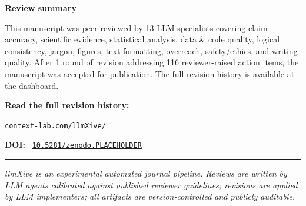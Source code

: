 \documentclass[11pt]{article}
\begin{document}
\noindent\textbf{\sffamily Review summary}\par
\vspace{0.3em}
\noindent\textcolor{badgeMuted}{This manuscript was peer-reviewed by 13 LLM
specialists covering claim accuracy, scientific evidence, statistical analysis,
data \& code quality, logical consistency, jargon, figures, text formatting,
overreach, safety/ethics, and writing quality. After 1 round of revision
addressing 116 reviewer-raised action items, the manuscript was accepted for
publication. The full revision history is available at the dashboard.}
\par
\vspace{1em}

\noindent\textbf{\sffamily Read the full revision history:}\par
\noindent\href{https://context-lab.com/llmXive/}{\texttt{context-lab.com/llmXive/}}\par
\vspace{0.5em}

\noindent\textbf{\sffamily DOI:}~%
\href{https://doi.org/10.5281/zenodo.PLACEHOLDER}{\texttt{10.5281/zenodo.PLACEHOLDER}}
\vfill

\noindent\textcolor{badgeMuted}{\rule{\textwidth}{0.4pt}}\par
\vspace{0.3em}
\noindent\small\textcolor{badgeMuted}{%
\textit{llmXive is an experimental automated journal pipeline. Reviews are
written by LLM agents calibrated against published reviewer guidelines;
revisions are applied by LLM implementers; all artifacts are version-controlled
and publicly auditable.}}
\end{document}
